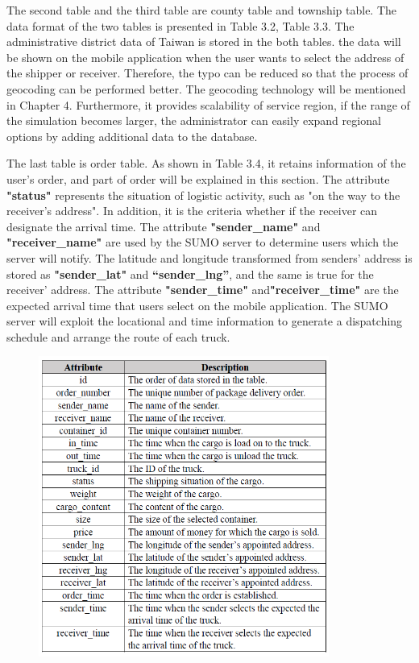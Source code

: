 \documentclass[12pt]{ksthesis}
\begin{document}
\begin{thesis}
{The second table and the third table are county table and township table. The data format of the two tables is presented in Table 3.2, Table 3.3. The administrative district data of Taiwan is stored in the both tables. the data will be shown on the mobile application when the user wants to select the address of the shipper or receiver. Therefore, the typo can be reduced so that the process of geocoding can be performed better. 
The geocoding technology will be mentioned in Chapter 4. Furthermore, it provides scalability of service region, if the range of the simulation becomes larger, the administrator can easily expand regional options by adding additional data to the database. 

The last table is order table. As shown in Table 3.4, it retains information of the user’s order, and part of order will be explained in this section. The attribute \textbf{"status"} represents the situation of logistic activity, such as "on the way to the receiver’s address". 
In addition, it is the criteria whether if the receiver can designate the arrival time. The attribute \textbf{"sender\_name"} and \textbf{"receiver\_name"} are used by the SUMO server to determine users which the server will notify. The latitude and longitude transformed from senders’ address is stored as\textbf{ "sender\_lat"} and \textbf{“sender\_lng”}, and the same is true for the receiver’ address. The attribute \textbf{"sender\_time"} and\textbf{"receiver\_time"} are the expected arrival time that users select on the mobile application. The SUMO server will exploit the locational and time information to generate a dispatching schedule and arrange the route of each truck. 

\begin{figure}[H]
\centering
{}
\includegraphics[width=0.85\textwidth]{./figures/Table3-4-OrderTable.PNG}
\vspace{0.5cm}
\label{Fig:OrderTable}
\end{figure}

}
\end{thesis}
\end{document}
